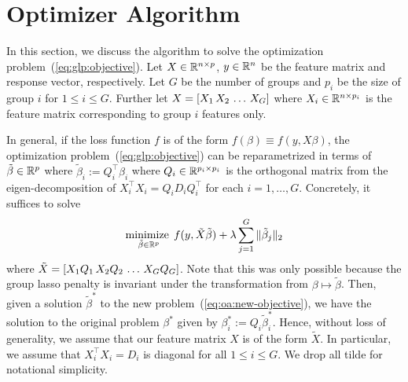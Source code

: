 \section{Optimizer Algorithm}\label{sec:optimizer}

In this section, we discuss the algorithm to solve the optimization problem~(\ref{eq:glp:objective}).
Let $X \in \mathbb{R}^{n\times p}$, $y\in \mathbb{R}^n$ be the feature matrix and response vector, respectively.
Let $G$ be the number of groups and $p_i$ be the size of group $i$ for $1\leq i\leq G$.
Further let $X = \left[X_1 \, X_2 \, \ldots \, X_G\right]$ where $X_i \in \mathbb{R}^{n \times p_i}$ is the feature matrix
corresponding to group $i$ features only.

In general, if the loss function $f$ is of the form $f(\beta) \equiv f(y, X\beta)$,
the optimization problem~(\ref{eq:glp:objective}) can be reparametrized
in terms of $\tilde{\beta} \in \mathbb{R}^p$ where $\tilde{\beta}_i := Q_i^\top \beta_i$
where $Q_i \in \mathbb{R}^{p_i \times p_i}$ is the orthogonal matrix from the eigen-decomposition of 
$X_i^\top X_i = Q_i D_i Q_i^\top$ for each $i=1,\ldots, G$.
Concretely, it suffices to solve
\begin{align}
    \operatorname*{minimize\;}_{\tilde{\beta} \in \mathbb{R}^p}
    f(y, \tilde{X} \tilde{\beta})
    + \lambda \sum\limits_{j=1}^G \|\tilde{\beta}_j\|_2
    \label{eq:oa:new-objective}
\end{align}
where $\tilde{X} = \left[X_1 Q_1 \, X_2 Q_2 \, \ldots \, X_G Q_G\right]$.
Note that this was only possible because the group lasso penalty is invariant under
the transformation from $\beta \mapsto \tilde{\beta}$.
Then, given a solution $\tilde{\beta}^*$ to the new problem~(\ref{eq:oa:new-objective}),
we have the solution to the original problem $\beta^*$ given by
$\beta^*_i := Q_i \tilde{\beta}_i^*$.
Hence, without loss of generality, we assume that 
our feature matrix $X$ is of the form $\tilde{X}$.
In particular, we assume that $X_i^\top X_i = D_i$ is diagonal for all $1\leq i\leq G$.
We drop all tilde for notational simplicity.

